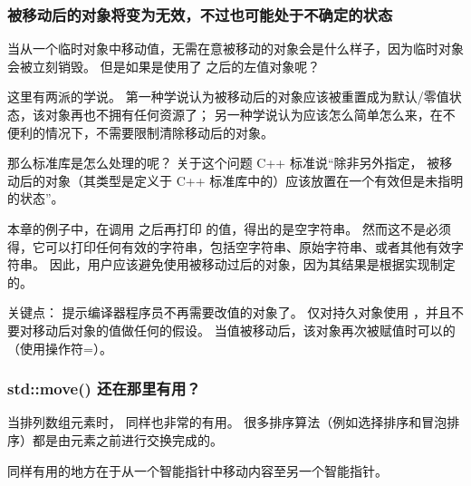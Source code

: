 \documentclass[../../LearnCpp.tex]{subfiles}
\begin{document}
\subsubsection*{被移动后的对象将变为无效，不过也可能处于不确定的状态}

当从一个临时对象中移动值，无需在意被移动的对象会是什么样子，因为临时对象会被立刻销毁。
但是如果是使用了  之后的左值对象呢？

这里有两派的学说。
第一种学说认为被移动后的对象应该被重置成为默认/零值状态，该对象再也不拥有任何资源了；
另一种学说认为应该怎么简单怎么来，在不便利的情况下，不需要限制清除移动后的对象。

那么标准库是怎么处理的呢？
关于这个问题 C++ 标准说“除非另外指定，
被移动后的对象（其类型是定义于 C++ 标准库中的）应该放置在一个有效但是未指明的状态”。

本章的例子中，在调用  之后再打印  的值，得出的是空字符串。
然而这不是必须得，它可以打印任何有效的字符串，包括空字符串、原始字符串、或者其他有效字符串。
因此，用户应该避免使用被移动过后的对象，因为其结果是根据实现制定的。

关键点： 提示编译器程序员不再需要改值的对象了。
仅对持久对象使用 ，并且不要对移动后对象的值做任何的假设。
当值被移动后，该对象再次被赋值时可以的（使用操作符=）。

\subsubsection*{std::move() 还在那里有用？}

当排列数组元素时， 同样也非常的有用。
很多排序算法（例如选择排序和冒泡排序）都是由元素之前进行交换完成的。

同样有用的地方在于从一个智能指针中移动内容至另一个智能指针。
\end{document}
